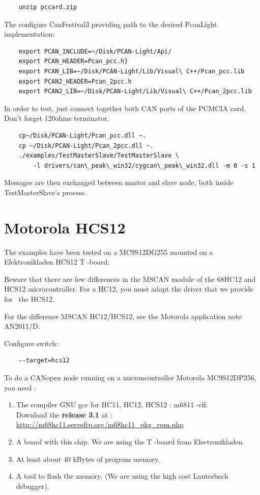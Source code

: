 \documentclass[12pt,english,a4paper]{book}
\newcommand{\canopen}{CANopen }
\begin{document}
\begin{verbatim}
	unzip pccard.zip
\end{verbatim}
The configure CanFestival3 providing path to the desired PcanLight
implementation:

\begin{verbatim}
	export PCAN_INCLUDE=~/Disk/PCAN-Light/Api/
	export PCAN_HEADER=Pcan_pcc.h}
	export PCAN_LIB=~/Disk/PCAN-Light/Lib/Visual\ C++/Pcan_pcc.lib
	export PCAN2_HEADER=Pcan_2pcc.h
	export PCAN2_LIB=~/Disk/PCAN-Light/Lib/Visual\ C++/Pcan_2pcc.lib
\end{verbatim}

In order to test, just connect together both CAN ports of the PCMCIA
card. Don't forget 120ohms terminator.

\begin{verbatim}
	cp~/Disk/PCAN-Light/Pcan_pcc.dll ~.
	cp ~/Disk/PCAN-Light/Pcan_2pcc.dll ~.
	./examples/TestMasterSlave/TestMasterSlave \
		-l drivers/can\_peak\_win32/cygcan\_peak\_win32.dll -m 0 -s 1
\end{verbatim}
Messages are then exchanged between master and slave node, both inside
TestMasterSlave's process.

\section{Motorola HCS12}

The examples have been tested on a MC9S12DG255 mounted on a Elektronikladen
HCS12 T -board.

Beware that there are few differences in the MSCAN module of the 68HC12
and HCS12 microcontroller. For a HC12, you must adapt the driver that
we provide for \ the HCS12.

For the difference MSCAN HC12/HCS12, see the Motorola application
note AN2011/D.

Configure switch:

\begin{verbatim}
	--target=hcs12
\end{verbatim}

To do a \canopen node running on a microncontroller Motorola MC9S12DP256,
you need :

\begin{enumerate}
\item The compiler GNU gcc for HC11, HC12, HCS12 : m6811 -elf. \\
 Download the \textbf{release 3.1} at : \href{http://m68hc11.serveftp.org/m68hc11_pkg_rpm.php}{http://m68hc11.serveftp.org/m68hc11\_pkg\_rpm.php} 
\item A board with this chip. We are using the T -board from Electronikladen. 
\item At least about 40 kBytes of program memory. 
\item A tool to flash the memory. (We are using the high cost Lauterbach
debugger). 
\end{enumerate}
\end{document}
